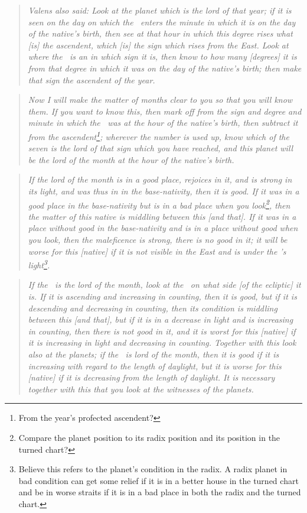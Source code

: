\begin{quote}
\textsl{
Valens also said: Look at the planet which is the lord of that year; if it is seen on the day on which the \Sun\, enters the minute in which it is on the day of the native's birth, then see at that hour in which this degree rises what [is] the ascendent, which [is] the sign which rises from the East. Look at where the \Moon\, is an in which sign it is, then know to how many [degrees] it is from that degree in which it was on the day of the native's birth; then make that sign the ascendent of the year.
}
\end{quote}
\begin{quote}
\textsl{
Now I will make the matter of months clear to you so that you will know them. If you want to know this, then mark off from the sign and degree and minute in which the \Moon\, was at the hour of the native's birth, then subtract it from the ascendent\footnote{From the year's profected ascendent?}; wherever the number is used up, know which of the seven is the lord of that sign which you have reached, and this planet will be the lord of the month at the hour of the native's birth.}
\end{quote}
\begin{quote}
\textsl{
If the lord of the month is in a good place, rejoices in it, and is strong in its light, and was thus in in the base-nativity, then it is good. If it was in a good place in the base-nativity but is in a bad place when you look\footnote{Compare the planet position to its radix position and its position in the turned chart?}, then the matter of this native is middling between this [and that]. If it was in a place without good in the base-nativity and is in a place without good when you look, then the maleficence is strong, there is no good in it; it will be worse for this [native] if it is not visible in the East and is under the \Sun's light\footnote{Believe this refers to the planet's condition in the radix. A radix planet in bad condition can get some relief if it is in a better house in the turned chart and be in worse straits if it is in a bad place in both the radix and the turned chart.}.}
\end{quote}
\begin{quote}
\textsl{
If the \Moon\, is the lord of the month, look at the \Moon\, on what side [of the ecliptic] it is. If it is ascending and increasing in counting, then it is good, but if it is descending and decreasing in counting, then its condition is middling between this [and that], but if it is in a decrease in light and is increasing in counting, then there is not good in it, and it is worst for this [native] if it is increasing in light and decreasing in counting. Together with this look also at the planets; if the \Sun\, is lord of the month, then it is good if it is increasing with regard to the length of daylight, but it is worse for this [native] if it is decreasing from the length of daylight. It is necessary together with this that you look at the witnesses of the planets.}
\end{quote}

